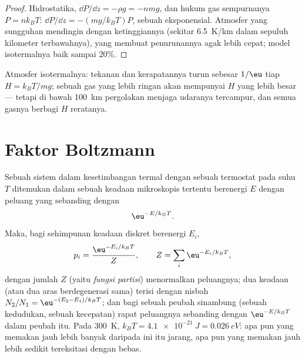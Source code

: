 \begin{proof}
Hidrostatika, $\dd P/\dd z = -\rho g = -nmg$, dan hukum gas sempurnanya $P
= nk_BT$: $\dd P/\dd z = -(mg/k_BT)P$, sebuah eksponensial. Atmosfer
yang sungguhan mendingin dengan ketinggiannya (sekitar \qty{6.5}{K/km} dalam sepuluh
kilometer terbawahnya), yang membuat penurunannya agak lebih cepat; model
isotermalnya baik sampai $20\%$.
\end{proof}

\begin{omfigure}

{\small Atmosfer isotermalnya: tekanan dan kerapatannya turun sebesar $1/\eu$
tiap  $H = k_BT/mg$; sebuah gas yang lebih ringan akan mempunyai $H$ yang lebih besar
--- tetapi di bawah \qty{100}{km} pergolakan menjaga udaranya tercampur, dan semua
gasnya berbagi $H$ reratanya.}
\end{omfigure}

\section{Faktor Boltzmann}

\begin{theorem}\label{thm:b2:boltzmann-factor:factor}
Sebuah sistem dalam kesetimbangan termal dengan sebuah termostat pada suhu
$T$ ditemukan dalam sebuah keadaan mikroskopis tertentu berenergi $E$ dengan
peluang yang sebanding dengan
\[
\eu^{-E/k_BT} .
\]
Maka, bagi sehimpunan keadaan diskret berenergi $E_i$,
\[
p_i = \frac{\eu^{-E_i/k_BT}}{Z}, \qquad Z = \sum_i\eu^{-E_i/k_BT} ,
\]
dengan jumlah $Z$ (yaitu \emph{fungsi partisi})
menormalkan peluangnya; dua keadaan (atau dua aras berdegenerasi
sama) terisi dengan nisbah $N_2/N_1 = \eu^{-(E_2 - E_1)/k_BT}$;
dan bagi sebuah peubah sinambung (sebuah kedudukan, sebuah kecepatan) rapat
peluangnya sebanding dengan $\eu^{-E/k_BT}$ dalam peubah itu. Pada
\qty{300}{K}, $k_BT = \qty{4.1e-21}{J} = \qty{0.026}{eV}$: apa pun yang
memakan jauh lebih banyak daripada ini itu jarang, apa pun yang memakan jauh lebih sedikit
tereksitasi dengan bebas.
\end{theorem}

